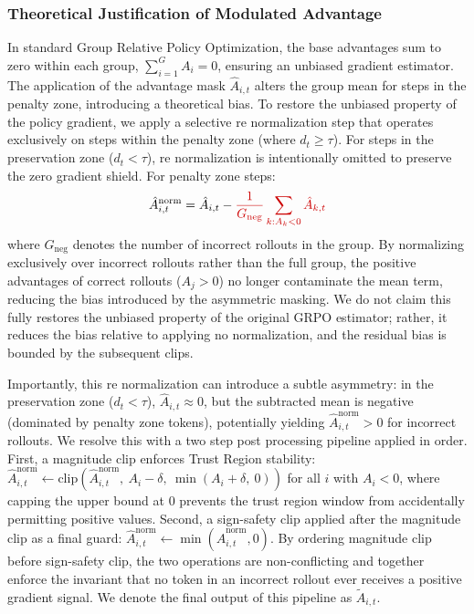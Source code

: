 \documentclass[conference]{IEEEtran}
\begin{document}
\subsubsection{Theoretical Justification of Modulated Advantage}
In standard Group Relative Policy Optimization, the base advantages sum to zero within each group, $\sum_{i=1}^G A_i = 0$, ensuring an unbiased gradient estimator. The application of the advantage mask $\hat{A}_{i,t}$ alters the group mean for steps in the penalty zone, introducing a theoretical bias. To restore the unbiased property of the policy gradient, we apply a selective re normalization step that operates exclusively on steps within the penalty zone (where $d_t \geq \tau$). For steps in the preservation zone ($d_t < \tau$), re normalization is intentionally omitted to preserve the zero gradient shield. For penalty zone steps:
\begin{equation}
\hat{A}_{i,t}^{\mathrm{norm}} = \hat{A}_{i,t} -
  \textcolor{red!80!black}{\frac{1}{G_{\mathrm{neg}}} \sum_{k : A_k < 0} \hat{A}_{k,t}}
\end{equation}
where $G_{\mathrm{neg}}$ denotes the number of incorrect rollouts in the group. By normalizing exclusively over incorrect rollouts rather than the full group, the positive advantages of correct rollouts ($A_j > 0$) no longer contaminate the mean term, reducing the bias introduced by the asymmetric masking. We do not claim this fully restores the unbiased property of the original GRPO estimator; rather, it reduces the bias relative to applying no normalization, and the residual bias is bounded by the subsequent clips.

Importantly, this re normalization can introduce a subtle asymmetry: in the preservation zone ($d_t < \tau$), $\hat{A}_{i,t} \approx 0$, but the subtracted mean is negative (dominated by penalty zone tokens), potentially yielding $\hat{A}_{i,t}^{\mathrm{norm}} > 0$ for incorrect rollouts. We resolve this with a two step post processing pipeline applied in order. First, a magnitude clip enforces Trust Region stability: $\hat{A}_{i,t}^{\mathrm{norm}} \leftarrow \mathrm{clip}(\hat{A}_{i,t}^{\mathrm{norm}},\ A_i - \delta,\ \min(A_i + \delta,\ 0))$ for all $i$ with $A_i < 0$, where capping the upper bound at $0$ prevents the trust region window from accidentally permitting positive values. Second, a sign-safety clip applied after the magnitude clip as a final guard: $\hat{A}_{i,t}^{\mathrm{norm}} \leftarrow \min(\hat{A}_{i,t}^{\mathrm{norm}}, 0)$. By ordering magnitude clip before sign-safety clip, the two operations are non-conflicting and together enforce the invariant that no token in an incorrect rollout ever receives a positive gradient signal. We denote the final output of this pipeline as $\tilde{A}_{i,t}$.
\end{document}
